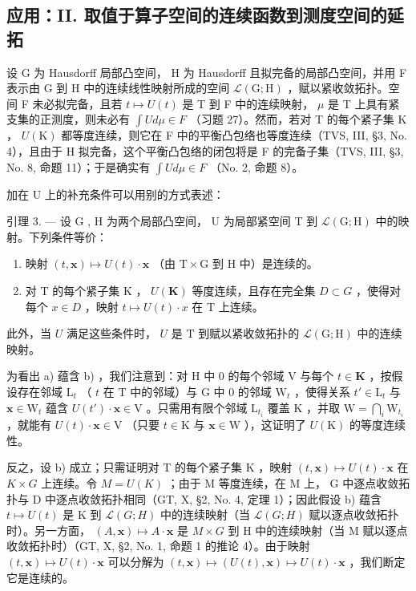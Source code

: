 \subsection{应用：II. 取值于算子空间的连续函数到测度空间的延拓}

设 G 为 Hausdorff 局部凸空间， H 为 Hausdorff 且拟完备的局部凸空间，并用 F 表示由 G 到 H 中的连续线性映射所成的空间 \(\mathcal{L}(\mathrm{G};\mathrm{H})\) ，赋以紧收敛拓扑。空间 F 未必拟完备，且若 \(t \mapsto U(t)\) 是 T 到 F 中的连续映射， \(\mu\) 是 T 上具有紧支集的正测度，则未必有 \(\int U d\mu \in F\) （习题 27）。然而，若对 T 的每个紧子集 K ， \(U(\mathrm{K})\) 都等度连续，则它在 F 中的平衡凸包络也等度连续（TVS, III, §3, No. 4），且由于 H 拟完备，这个平衡凸包络的闭包将是 F 的完备子集（TVS, III, §3, No. 8, 命题 11）；于是确实有 \(\int U d\mu \in F\) （No. 2, 命题 8）。

加在 U 上的补充条件可以用别的方式表述：

引理 3. --- 设 G , H 为两个局部凸空间， U 为局部紧空间 T 到 \(\mathcal{L}(\mathrm{G};\mathrm{H})\) 中的映射。下列条件等价：

\begin{enumerate}
\def\labelenumi{\alph{enumi})}
\item
  映射 \((t,\mathbf{x})\mapsto U(t)\cdot \mathbf{x}\) （由 \(\mathrm{T}\times \mathrm{G}\) 到 H 中）是连续的。
\item
  对 T 的每个紧子集 K ， \(U(\mathbf{K})\) 等度连续，且存在完全集 \(D \subset G\) ，使得对每个 \(x \in D\) ，映射 \(t \mapsto U(t) \cdot x\) 在 T 上连续。
\end{enumerate}

此外，当 \(U\) 满足这些条件时， \(U\) 是 \(\mathrm{T}\) 到赋以紧收敛拓扑的 \(\mathcal{L}(\mathrm{G};\mathrm{H})\) 中的连续映射。

为看出 a) 蕴含 b) ，我们注意到：对 H 中 0 的每个邻域 V 与每个 \(t \in \mathbf{K}\) ，按假设存在邻域 \(\mathrm{L}_t\) （ \(t\) 在 T 中的邻域）与 G 中 0 的邻域 \(\mathrm{W}_t\) ，使得关系 \(t' \in \mathrm{L}_t\) 与 \(\mathbf{x} \in \mathrm{W}_t\) 蕴含 \(U(t') \cdot \mathbf{x} \in \mathrm{V}\) 。只需用有限个邻域 \(\mathrm{L}_{t_i}\) 覆盖 K ，并取 \(\mathrm{W} = \bigcap_{i} \mathrm{W}_{t_i}\) ，就能有 \(U(t) \cdot \mathbf{x} \in \mathrm{V}\) （只要 \(t \in \mathrm{K}\) 与 \(\mathbf{x} \in \mathrm{W}\) ），这证明了 \(U(\mathrm{K})\) 的等度连续性。

反之，设 b) 成立；只需证明对 T 的每个紧子集 K ，映射 \((t,\mathbf{x})\mapsto U(t)\cdot\mathbf{x}\) 在 \(K\times G\) 上连续。令 \(M=U(K)\) ；由于 M 等度连续，在 M 上， G 中逐点收敛拓扑与 D 中逐点收敛拓扑相同（GT, X, §2, No. 4, 定理 1）；因此假设 b) 蕴含 \(t\mapsto U(t)\) 是 K 到 \(\mathcal{L}(G;H)\) 中的连续映射（当 \(\mathcal{L}(G;H)\) 赋以逐点收敛拓扑时）。另一方面， \((A,\mathbf{x})\mapsto A\cdot\mathbf{x}\) 是 \(M\times G\) 到 H 中的连续映射（当 M 赋以逐点收敛拓扑时）（GT, X, §2, No. 1, 命题 1 的推论 4）。由于映射 \((t,\mathbf{x})\mapsto U(t)\cdot\mathbf{x}\) 可以分解为 \((t,\mathbf{x})\mapsto(U(t),\mathbf{x})\mapsto U(t)\cdot\mathbf{x}\) ，我们断定它是连续的。

